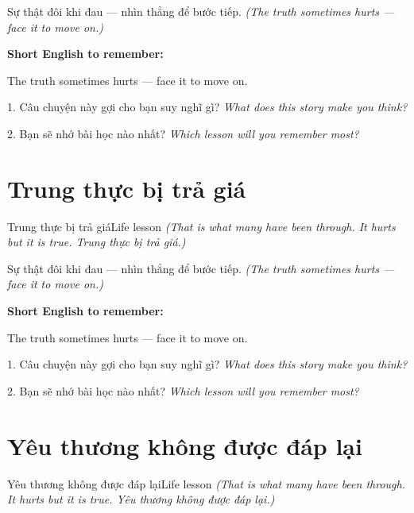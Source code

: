 \begin{baihoc}
Sự thật đôi khi đau — nhìn thẳng để bước tiếp.
\textit{(The truth sometimes hurts — face it to move on.)}
\end{baihoc}

\begin{ghinhoanh}
\textbf{Short English to remember:}

The truth sometimes hurts — face it to move on.

\end{ghinhoanh}

\begin{tuhocnhanh}
1. Câu chuyện này gợi cho bạn suy nghĩ gì? \textit{What does this story make you think?}

2. Bạn sẽ nhớ bài học nào nhất? \textit{Which lesson will you remember most?}
\end{tuhocnhanh}
\ngancach


\section{Trung thực bị trả giá}
\begin{truyen}{Trung thực bị trả giá}{Life lesson}
\textit{(That is what many have been through. It hurts but it is true. Trung thực bị trả giá.)}
\end{truyen}

\begin{baihoc}
Sự thật đôi khi đau — nhìn thẳng để bước tiếp.
\textit{(The truth sometimes hurts — face it to move on.)}
\end{baihoc}

\begin{ghinhoanh}
\textbf{Short English to remember:}

The truth sometimes hurts — face it to move on.

\end{ghinhoanh}

\begin{tuhocnhanh}
1. Câu chuyện này gợi cho bạn suy nghĩ gì? \textit{What does this story make you think?}

2. Bạn sẽ nhớ bài học nào nhất? \textit{Which lesson will you remember most?}
\end{tuhocnhanh}
\ngancach


\section{Yêu thương không được đáp lại}
\begin{truyen}{Yêu thương không được đáp lại}{Life lesson}
\textit{(That is what many have been through. It hurts but it is true. Yêu thương không được đáp lại.)}
\end{truyen}

